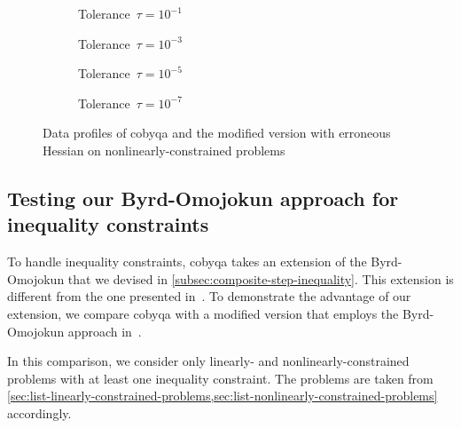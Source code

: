 \begin{figure}[ht]
    \centering
    \begin{subfigure}[b]{0.49\textwidth}
        \centering
        \caption{Tolerance~$\tau = 10^{-1}$}
    \end{subfigure}
    \hfill
    \begin{subfigure}[b]{0.49\textwidth}
        \centering
        \caption{Tolerance~$\tau = 10^{-3}$}
    \end{subfigure}
    \begin{subfigure}[b]{0.49\textwidth}
        \centering
        \caption{Tolerance~$\tau = 10^{-5}$}
    \end{subfigure}
    \hfill
    \begin{subfigure}[b]{0.49\textwidth}
        \centering
        \caption{Tolerance~$\tau = 10^{-7}$}
    \end{subfigure}
    \caption{Data profiles of \gls{cobyqa} and the modified version with erroneous Hessian on nonlinearly-constrained problems}
    \label{fig:data-wrong-hessian}
\end{figure}

\subsection{Testing our Byrd-Omojokun approach for inequality constraints}
\label{subsec:perf-byrd-omojokun}

To handle inequality constraints, \gls{cobyqa} takes an extension of the Byrd-Omojokun that we devised in \cref{subsec:composite-step-inequality}.
This extension is different from the one presented in~\cite[\S~15.4.4]{Conn_Gould_Toint_2000}.
To demonstrate the advantage of our extension, we compare \gls{cobyqa} with a modified version that employs the Byrd-Omojokun approach in~\cite[\S~15.4.4]{Conn_Gould_Toint_2000}.

In this comparison, we consider only linearly- and nonlinearly-constrained problems with at least one inequality constraint.
The problems are taken from \cref{sec:list-linearly-constrained-problems,sec:list-nonlinearly-constrained-problems} accordingly.

